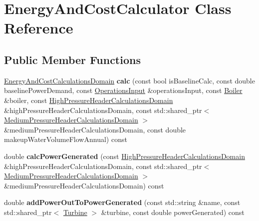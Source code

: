 \hypertarget{class_energy_and_cost_calculator}{}\section{Energy\+And\+Cost\+Calculator Class Reference}
\label{class_energy_and_cost_calculator}
\subsection*{Public Member Functions}
\begin{DoxyCompactItemize}
\item 
\mbox{\label{class_energy_and_cost_calculator_aa301f421bf405bd8a75ac190bb4cad3d}} 
\hyperlink{class_energy_and_cost_calculations_domain}{Energy\+And\+Cost\+Calculations\+Domain} {\bfseries calc} (const bool is\+Baseline\+Calc, const double baseline\+Power\+Demand, const \hyperlink{class_operations_input}{Operations\+Input} \&operations\+Input, const \hyperlink{class_boiler}{Boiler} \&boiler, const \hyperlink{class_high_pressure_header_calculations_domain}{High\+Pressure\+Header\+Calculations\+Domain} \&high\+Pressure\+Header\+Calculations\+Domain, const std\+::shared\+\_\+ptr$<$ \hyperlink{class_medium_pressure_header_calculations_domain}{Medium\+Pressure\+Header\+Calculations\+Domain} $>$ \&medium\+Pressure\+Header\+Calculations\+Domain, const double makeup\+Water\+Volume\+Flow\+Annual) const
\item 
\mbox{\label{class_energy_and_cost_calculator_a25f512a60f88cc36af0fc0978d841c8a}} 
double {\bfseries calc\+Power\+Generated} (const \hyperlink{class_high_pressure_header_calculations_domain}{High\+Pressure\+Header\+Calculations\+Domain} \&high\+Pressure\+Header\+Calculations\+Domain, const std\+::shared\+\_\+ptr$<$ \hyperlink{class_medium_pressure_header_calculations_domain}{Medium\+Pressure\+Header\+Calculations\+Domain} $>$ \&medium\+Pressure\+Header\+Calculations\+Domain) const
\item 
\mbox{\label{class_energy_and_cost_calculator_acea571a402a377985753ebfaebad6fcc}} 
double {\bfseries add\+Power\+Out\+To\+Power\+Generated} (const std\+::string \&name, const std\+::shared\+\_\+ptr$<$ \hyperlink{class_turbine}{Turbine} $>$ \&turbine, const double power\+Generated) const
\item 

\end{DoxyCompactItemize}
